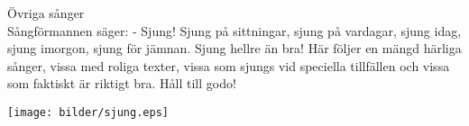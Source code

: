 \begin{flushleft}
{\Huge Övriga sånger\\}
\vspace{1cm}
{\Large
Sångförmannen säger:
- Sjung! Sjung på sittningar, sjung på vardagar, sjung idag, sjung
imorgon, sjung för jämnan. Sjung hellre än bra! Här följer en mängd härliga sånger, vissa
med roliga texter, vissa som sjungs vid speciella tillfällen och vissa
som faktiskt är riktigt bra. Håll till godo! 
}
\end{flushleft}

\vspace{2cm}
\begin{center}
\texttt{[image: bilder/sjung.eps]}
\end{center}
\newpage

\newpage
\newpage
{}
\newpage
\newpage
{}
\newpage
\newpage
{}
\newpage
{}
\newpage
\newpage
\newpage
{}
\newpage
{}
\newpage
{}
\newpage
{}
\newpage
{}
\newpage
{}
\newpage
\newpage
{}
\newpage
{}
